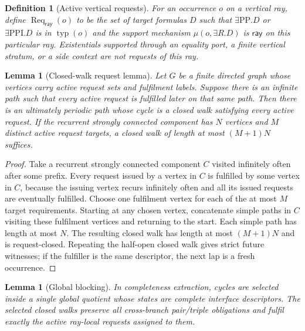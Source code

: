 \documentclass[11pt]{article}
\newtheorem{lemma}[theorem]{Lemma}
\newtheorem{definition}[theorem]{Definition}
\newcommand{\typ}{\operatorname{typ}}
\newcommand{\PP}{\mathrm{PP}}
\newcommand{\PPI}{\mathrm{PPI}}
\newcommand{\Req}{\operatorname{Req}}
\newcommand{\ray}{\mathsf{ray}}
\begin{document}
\begin{definition}[Active vertical requests]
For an occurrence $o$ on a vertical ray, define $\Req_{\ray}(o)$ to be the set of target formulas $D$ such that $\exists\PP.D$ or $\exists\PPI.D$ is in $\typ(o)$ and the support mechanism $\mu(o,\exists R.D)$ is $\ray$ on this particular ray.  Existentials supported through an equality port, a finite vertical stratum, or a side context are not requests of this ray.
\end{definition}

\begin{lemma}[Closed-walk request lemma]
\label{lem:closed-walk}
Let $G$ be a finite directed graph whose vertices carry active request sets and fulfilment labels.  Suppose there is an infinite path such that every active request is fulfilled later on that same path.  Then there is an ultimately periodic path whose cycle is a closed walk satisfying every active request.  If the recurrent strongly connected component has $N$ vertices and $M$ distinct active request targets, a closed walk of length at most $(M+1)N$ suffices.
\end{lemma}

\begin{proof}
Take a recurrent strongly connected component $C$ visited infinitely often after some prefix.  Every request issued by a vertex in $C$ is fulfilled by some vertex in $C$, because the issuing vertex recurs infinitely often and all its issued requests are eventually fulfilled.  Choose one fulfilment vertex for each of the at most $M$ target requirements.  Starting at any chosen vertex, concatenate simple paths in $C$ visiting these fulfilment vertices and returning to the start.  Each simple path has length at most $N$.  The resulting closed walk has length at most $(M+1)N$ and is request-closed.  Repeating the half-open closed walk gives strict future witnesses; if the fulfiller is the same descriptor, the next lap is a fresh occurrence.
\end{proof}

\begin{lemma}[Global blocking]
\label{lem:global-blocking}
In completeness extraction, cycles are selected inside a single global quotient whose states are complete interface descriptors.  The selected closed walks preserve all cross-branch pair/triple obligations and fulfil exactly the active ray-local requests assigned to them.
\end{lemma}
\end{document}
